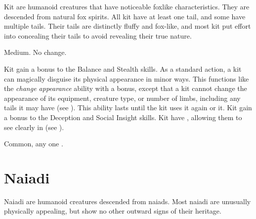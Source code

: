   Kit are humanoid creatures that have noticeable foxlike characteristics.
  They are descended from natural fox spirits.
  All kit have at least one tail, and some have multiple tails.
  Their tails are distinctly fluffy and fox-like, and most kit put effort into concealing their tails to avoid revealing their true nature.

   Medium.
   No change.
  \begin{itemize}
     Kit gain a  bonus to the Balance and Stealth skills.
     As a standard action, a kit can magically disguise its physical appearance in minor ways.
      This functions like the \textit{change appearance} ability with a  bonus, except that a kit cannot change the appearance of its equipment, creature type, or number of limbs, including any tails it may have (see ).
      This ability lasts until the kit uses it again or  it.
     Kit gain a  bonus to the Deception and Social Insight skills.
     Kit have , allowing them to see clearly in  (see ).
  \end{itemize}
   Common, any one .

\section{Naiadi}
  Naiadi are humanoid creatures descended from naiads.
  Most naiadi are unusually physically appealing, but show no other outward signs of their heritage.

